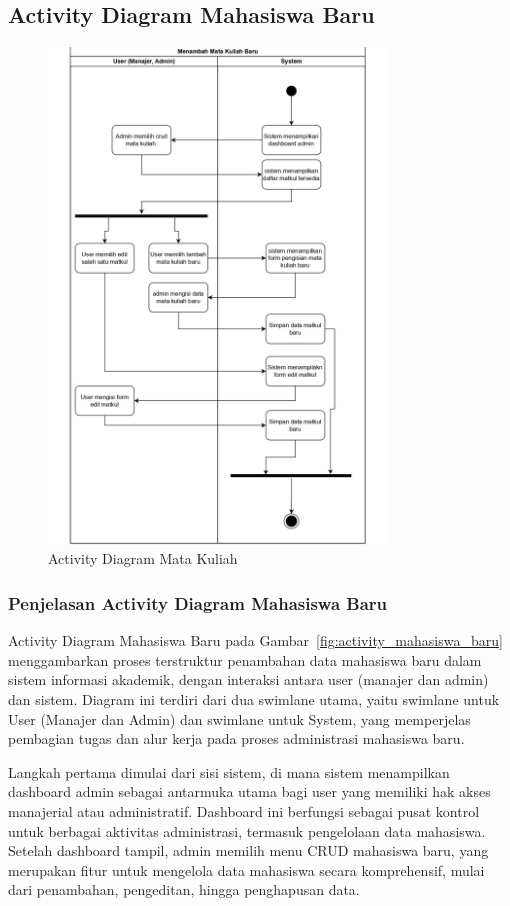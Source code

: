 \documentclass[a4paper,oneside,11pt]{book}
\begin{document}
\subsection{Activity Diagram Mahasiswa Baru}
\begin{figure}[H]
  \centering
  \includegraphics[width=0.8\textwidth]{Activity Diagram/Mata kuliah.jpg}
  \caption{Activity Diagram Mata Kuliah}
  \label{fig:activity_mata_kuliah}
\end{figure}
\subsubsection{Penjelasan Activity Diagram Mahasiswa Baru}
Activity Diagram Mahasiswa Baru pada Gambar~\ref{fig:activity_mahasiswa_baru} menggambarkan proses terstruktur penambahan data mahasiswa baru dalam sistem informasi akademik, dengan interaksi antara user (manajer dan admin) dan sistem. Diagram ini terdiri dari dua swimlane utama, yaitu swimlane untuk User (Manajer dan Admin) dan swimlane untuk System, yang memperjelas pembagian tugas dan alur kerja pada proses administrasi mahasiswa baru.

Langkah pertama dimulai dari sisi sistem, di mana sistem menampilkan dashboard admin sebagai antarmuka utama bagi user yang memiliki hak akses manajerial atau administratif. Dashboard ini berfungsi sebagai pusat kontrol untuk berbagai aktivitas administrasi, termasuk pengelolaan data mahasiswa. Setelah dashboard tampil, admin memilih menu CRUD mahasiswa baru, yang merupakan fitur untuk mengelola data mahasiswa secara komprehensif, mulai dari penambahan, pengeditan, hingga penghapusan data.
\end{document}
